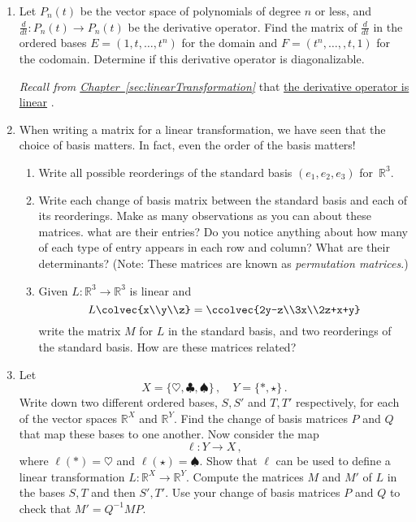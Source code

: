 


\begin{enumerate}
\item Let $P_n(t)$ be the vector space of polynomials of degree $n$ or less, and $\frac{d}{dt} \colon P_n(t) \to P_{n}(t)$ be the derivative operator.  Find the matrix of $\frac{d}{dt}$ in the ordered bases $E=(1,t,\ldots,t^n )$ for the domain and $F=(t^{n}, \ldots, ,t,1 )$ for the codomain. Determine if this derivative operator is diagonalizable. 

\emph{Recall from 
\hyperref[sec:linearTransformation]{Chapter~\ref*{sec:linearTransformation}}} 
that \hyperlink{derivative_linear}{the derivative operator is linear} .


\item When writing a matrix for a linear transformation, we have seen that the choice of basis matters.  In fact, even the order of the basis matters!
\begin{enumerate}
\item Write all possible reorderings of the standard basis $(e_1,e_2,e_3)$ for~$\mathbb{R}^3$.
\item Write each change of basis matrix between the standard basis and each of its reorderings.  Make as many observations as you can about these matrices. what are their entries? Do you notice anything about how many of each type of entry appears in each row and column? What are their determinants?  (Note: These matrices are known as \emph{permutation matrices}.)
\item Given $L:\mathbb{R}^3\to \mathbb{R}^3$ is linear and  
\[
L\colvec{x\\y\\z}=\ccolvec{2y-z\\3x\\2z+x+y}
\] 
write the matrix $M$ for $L$ in the standard basis, and two reorderings of the standard basis.  How are these matrices related?
\end{enumerate}


\item Let \[X=\{\heartsuit,\clubsuit,\spadesuit\}\, ,\quad Y=\{*,\star\}\, .\] Write down two different ordered bases, $S,S'$ and $T,T'$ respectively, for each of the vector spaces ${\mathbb R}^X$ and ${\mathbb R}^Y$. Find the change of basis matrices $P$ and $Q$ that map these bases to one another. Now consider the map
\[
\ell:Y\to X\, ,
\]
where $\ell(*)=\heartsuit$ and $\ell(\star)=\spadesuit$. Show that $\ell$ can be used to define a linear transformation $L:{\mathbb R}^X\to{\mathbb R}^Y$. Compute the matrices $M$ and $M'$ of $L$ in the bases $S,T$ and then $S',T'$. Use your change of basis matrices $P$ and $Q$ to 
check that $M'=Q^{-1}MP$.


\end{enumerate}
